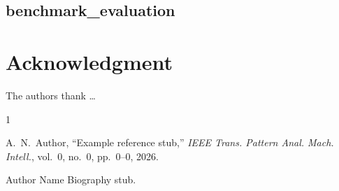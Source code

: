 \documentclass[lettersize,journal]{IEEEtran}
\begin{document}
\subsection{benchmark\_evaluation}



\section*{Acknowledgment}
The authors thank \ldots\ %

\begin{thebibliography}{1}


A.~N.~Author, ``Example reference stub,'' \textit{IEEE Trans. Pattern Anal. Mach. Intell.}, vol.~0, no.~0, pp.~0--0, 2026.

\end{thebibliography}

\begin{IEEEbiographynophoto}{Author Name}
Biography stub.
\end{IEEEbiographynophoto}
\end{document}
